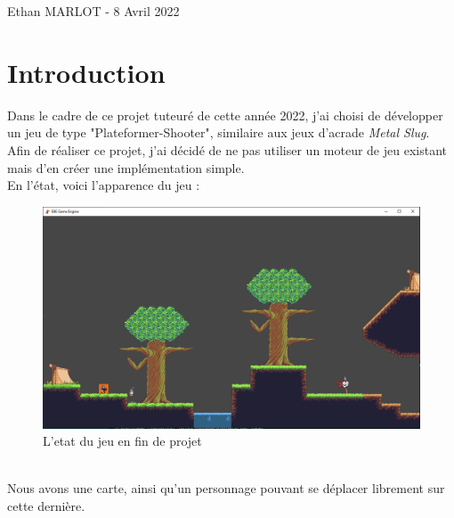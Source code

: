 \documentclass[12pt, openany]{report}
\begin{document}
\begin{titlepage}
\begin{rmfamily}
\begin{center}
    \vfill

    {\large Ethan \textsc{MARLOT} - 8 Avril 2022}

  \end{center}
  \end{rmfamily}
\end{titlepage}

\tableofcontents

\chapter{Introduction}
Dans le cadre de ce projet tuteur\'e de cette ann\'ee 2022, j'ai choisi de d\'evelopper un jeu de type "Plateformer-Shooter", similaire aux jeux d'acrade \textit{Metal Slug}. Afin de r\'ealiser ce projet, j'ai d\'ecid\'e de ne pas utiliser un moteur de jeu existant mais d'en cr\'eer une impl\'ementation simple.
\\[0.5cm]
\indent En l'\'etat, voici l'apparence du jeu :\\[0.2cm]
\begin{figure}[!h]
\centering
\includegraphics[scale=0.5]{etatJeuActuel.png}
\caption{L'etat du jeu en fin de projet}
\end{figure}
\\[0.5cm]
\indent Nous avons une carte, ainsi qu'un personnage pouvant se d\'eplacer librement sur cette derni\`ere.
\end{document}
